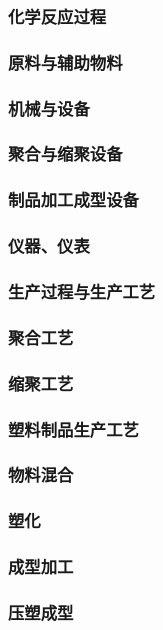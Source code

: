 \documentclass[UTF8]{../../ApplicationUniverse}
\begin{document}
    \subsubsection{化学反应过程}
    \subsubsection{原料与辅助物料}
    \subsubsection{机械与设备}
        \subsubsection{聚合与缩聚设备}
        \subsubsection{制品加工成型设备}
        \subsubsection{仪器、仪表}
    \subsubsection{生产过程与生产工艺}
        \subsubsection{聚合工艺}
        \subsubsection{缩聚工艺}
        \subsubsection{塑料制品生产工艺}
        \subsubsection{物料混合}
        \subsubsection{塑化}
        \subsubsection{成型加工}
            \subsubsection{压塑成型}
\end{document}

